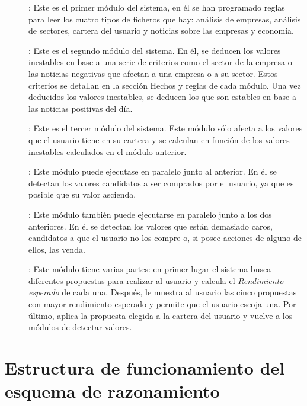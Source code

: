 \documentclass[11pt,openany]{book} %
\begin{document}
\begin{description}
    \item[\color{ocre}{Lectura de datos}]: Este es el primer módulo del sistema, en él se han programado reglas para leer los cuatro tipos de ficheros que hay: análisis de empresas, análisis de sectores, cartera del usuario y noticias sobre las empresas y economía.

    \item[\color{ocre}{Deducción de valores}]: Este es el segundo módulo del sistema. En él, se deducen los valores inestables en base a una serie de criterios como el sector de la empresa o las noticias negativas que afectan a una empresa o a su sector. Estos criterios se detallan en la sección Hechos y reglas de cada módulo. Una vez deducidos los valores inestables, se deducen los que son estables en base a las noticias positivas del día.

    \item[\color{ocre}{Detección de valores peligrosos}]: Este es el tercer módulo del sistema. Este módulo sólo afecta a los valores que el usuario tiene en su cartera y se calculan en función de los valores inestables calculados en el módulo anterior.

    \item[\color{ocre}{Detección de valores infravalorados}]: Este módulo puede ejecutase en paralelo junto al anterior. En él se detectan los valores candidatos a ser comprados por el usuario, ya que es posible que su valor ascienda.

    \item[\color{ocre}{Detección de valores sobrevalorados}]: Este módulo también puede ejecutarse en paralelo junto a los dos anteriores. En él se detectan los valores que están demasiado caros, candidatos a que el usuario no los compre o, si posee acciones de alguno de ellos, las venda.

    \item[\color{ocre}{Realización de propuestas}]: Este módulo tiene varias partes: en primer lugar el sistema busca diferentes propuestas para realizar al usuario y calcula el \textit{\textcolor{ocre}{Rendimiento esperado}} de cada una. Después, le muestra al usuario las cinco propuestas con mayor rendimiento esperado y permite que el usuario escoja una. Por último, aplica la propuesta elegida a la cartera del usuario y vuelve a los módulos de detectar valores.
\end{description}

\section{Estructura de funcionamiento del esquema de razonamiento}
\end{document}
